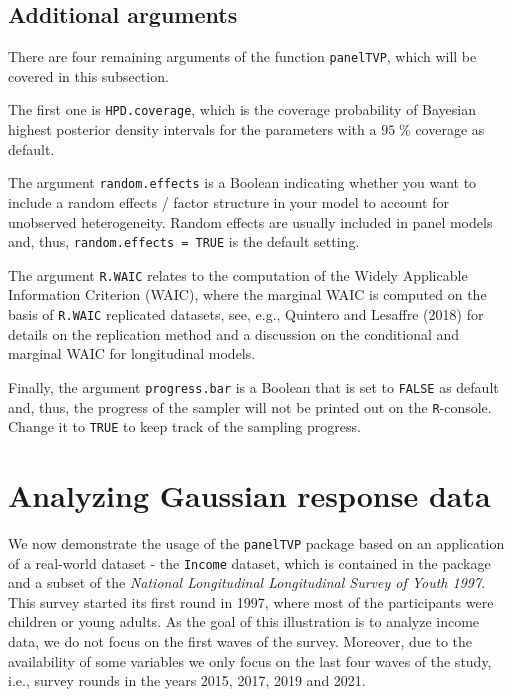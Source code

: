 \documentclass[a4paper, preprint, 3p,
authoryear]{elsarticle} %
\begin{document}
\subsection{Additional arguments}\label{additional-arguments}

There are four remaining arguments of the function \texttt{panelTVP},
which will be covered in this subsection.

The first one is \texttt{HPD.coverage}, which is the coverage
probability of Bayesian highest posterior density intervals for the
parameters with a \(95 \; \%\) coverage as default.

The argument \texttt{random.effects} is a Boolean indicating whether you
want to include a random effects / factor structure in your model to
account for unobserved heterogeneity. Random effects are usually
included in panel models and, thus, \texttt{random.effects = TRUE} is
the default setting.

The argument \texttt{R.WAIC} relates to the computation of the Widely
Applicable Information Criterion (WAIC), where the marginal WAIC is
computed on the basis of \texttt{R.WAIC} replicated datasets, see, e.g.,
Quintero and Lesaffre (2018) for details on the replication method and a
discussion on the conditional and marginal WAIC for longitudinal models.

Finally, the argument \texttt{progress.bar} is a Boolean that is set to
\texttt{FALSE} as default and, thus, the progress of the sampler will
not be printed out on the \texttt{R}-console. Change it to \texttt{TRUE}
to keep track of the sampling progress.

\section{Analyzing Gaussian response
data}\label{analyzing-gaussian-response-data}

We now demonstrate the usage of the \texttt{panelTVP} package based on
an application of a real-world dataset - the \texttt{Income} dataset,
which is contained in the package and a subset of the
\textit{National Longitudinal Longitudinal Survey of Youth 1997}. This
survey started its first round in 1997, where most of the participants
were children or young adults. As the goal of this illustration is to
analyze income data, we do not focus on the first waves of the survey.
Moreover, due to the availability of some variables we only focus on the
last four waves of the study, i.e., survey rounds in the years 2015,
2017, 2019 and 2021.
\end{document}
